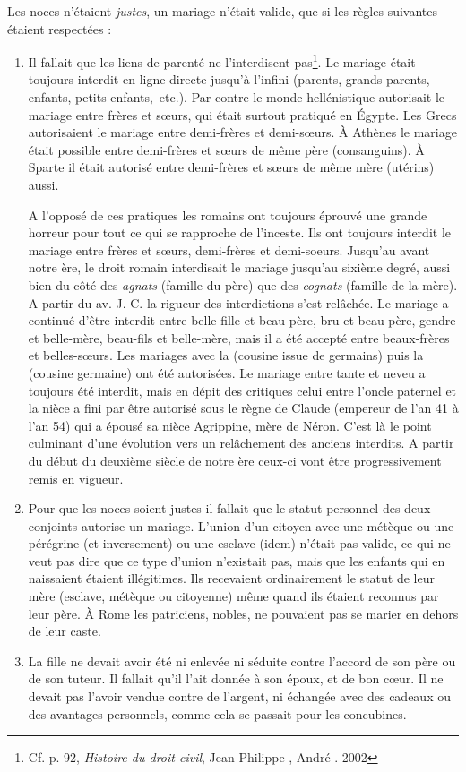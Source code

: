 Les noces n'étaient \emph{justes}, un mariage n'était valide, que si les règles
suivantes étaient respectées :
\begin{enumerate}
\item Il fallait que les liens de parenté ne l'interdisent pas\footnote{Cf. p. 92, \emph{Histoire du droit civil}, Jean-Philippe , André . 2002}.
Le mariage
était toujours interdit en ligne directe jusqu'à l'infini (parents,
grands-parents, enfants, petits-enfants,~etc.). Par contre le monde hellénistique
autorisait le mariage entre frères et sœurs, qui était surtout
pratiqué en Égypte. Les Grecs autorisaient le mariage entre demi-frères et
demi-sœurs. À Athènes le mariage était possible entre demi-frères et sœurs de
même père (consanguins). À Sparte il était autorisé entre demi-frères et
sœurs de même mère (utérins) aussi. 

A l'opposé de ces pratiques les romains ont toujours éprouvé une grande horreur pour tout ce qui se rapproche de l'inceste. Ils ont toujours interdit
le mariage entre frères et sœurs, demi-frères et demi-soeurs. Jusqu'au  avant notre
ère, le droit romain interdisait le mariage jusqu'au sixième degré, aussi
bien du côté des \emph{agnats} (famille du père) que des \emph{cognats} (famille de la
mère). A partir du  av. J.-C.  la rigueur des interdictions s'est relâchée. Le mariage a continué d'être interdit entre
belle-fille et beau-père, bru et beau-père, gendre et belle-mère, beau-fils et belle-mère,
mais il a été accepté entre beaux-frères et belles-sœurs. Les mariages avec la 
(cousine issue de germains) puis la  (cousine germaine) ont été
autorisées. Le mariage entre tante et neveu a toujours été interdit, mais en dépit des critiques celui 
entre l'oncle paternel et la nièce a fini par être autorisé  sous le règne de Claude (empereur de l'an 41 à l'an 54) qui a épousé sa nièce Agrippine, mère de Néron. C'est là le point culminant d'une évolution vers un relâchement des anciens interdits. A partir du début du deuxième siècle de notre ère ceux-ci vont être progressivement remis en vigueur. 
 
\item Pour que les noces soient justes il fallait que le statut personnel des deux conjoints autorise un
mariage. L'union d'un citoyen avec une métèque ou une pérégrine (et inversement)
ou une esclave (idem) n'était pas valide, ce qui ne veut pas dire
que ce type d'union n'existait pas, mais que les enfants qui en naissaient étaient illégitimes. Ils recevaient ordinairement le statut de leur mère (esclave, métèque ou citoyenne) même quand ils
étaient reconnus par leur père. À Rome les patriciens, nobles, ne pouvaient pas
se marier en dehors de leur caste.
\item La fille ne devait avoir été ni enlevée ni séduite contre l'accord
de son père ou de son tuteur. Il fallait qu'il l'ait donnée à son époux, et
de bon cœur. Il ne devait pas l'avoir vendue contre de l'argent, ni échangée
avec des cadeaux ou des avantages personnels, comme cela se passait
pour les concubines.
\end{enumerate}
